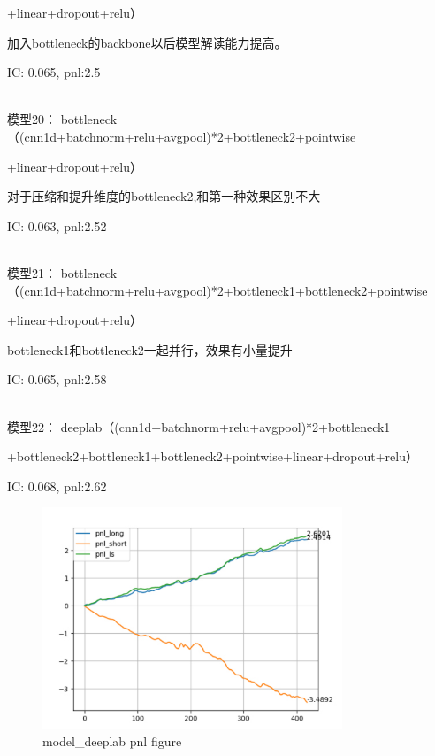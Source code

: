 \documentclass[11pt]{ctexart}
\begin{document}
+linear+dropout+relu）

加入bottleneck的backbone以后模型解读能力提高。

{\kaishu \small IC: 0.065, pnl:2.5}



~\\
模型20： bottleneck（(cnn1d+batchnorm+relu+avgpool)*2+bottleneck2+pointwise

+linear+dropout+relu）

对于压缩和提升维度的bottleneck2,和第一种效果区别不大

{\kaishu \small IC: 0.063, pnl:2.52}



~\\
模型21： bottleneck（(cnn1d+batchnorm+relu+avgpool)*2+bottleneck1+bottleneck2+pointwise

+linear+dropout+relu）

bottleneck1和bottleneck2一起并行，效果有小量提升

{\kaishu \small IC: 0.065, pnl:2.58}



~\\
模型22： deeplab（(cnn1d+batchnorm+relu+avgpool)*2+bottleneck1

+bottleneck2+bottleneck1+bottleneck2+pointwise+linear+dropout+relu）

{\kaishu \small IC: 0.068, pnl:2.62}

\begin{figure}[H]
\begin{center}
\includegraphics[width=0.8\textwidth]{plt2.PNG}
\end{center}
\caption{model\_deeplab pnl figure}
\label{FIG.2}
\end{figure}
\end{document}
